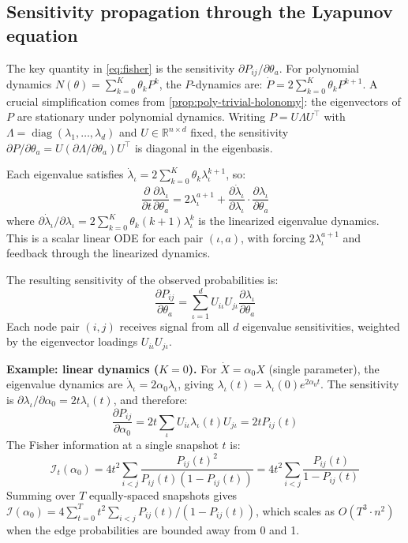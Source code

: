 \documentclass{article}
\newcommand{\RR}{\mathbb{R}}
\DeclareMathOperator{\diag}{diag}
\theoremstyle{plain}
\theoremstyle{definition}
\theoremstyle{remark}
\begin{document}
\subsection{Sensitivity propagation through the Lyapunov equation}

The key quantity in \cref{eq:fisher} is the sensitivity $\partial P_{ij} / \partial \theta_a$.
For polynomial dynamics $N(\theta) = \sum_{k=0}^K \theta_k P^k$, the $P$-dynamics are:
$\dot{P} = 2 \sum_{k=0}^K \theta_k P^{k+1}$.
A crucial simplification comes from \cref{prop:poly-trivial-holonomy}: the eigenvectors of $P$ are stationary under polynomial dynamics.
Writing $P = U \Lambda U^\top$ with $\Lambda = \diag(\lambda_1, \ldots, \lambda_d)$ and $U \in \RR^{n \times d}$ fixed, the sensitivity $\partial P / \partial \theta_a = U (\partial \Lambda / \partial \theta_a) U^\top$ is diagonal in the eigenbasis.

Each eigenvalue satisfies $\dot{\lambda}_\iota = 2 \sum_{k=0}^K \theta_k \lambda_\iota^{k+1}$, so:
\begin{equation}
\frac{\partial}{\partial t} \frac{\partial \lambda_\iota}{\partial \theta_a} = 2 \lambda_\iota^{a+1} + \frac{\partial \dot{\lambda}_\iota}{\partial \lambda_\iota} \cdot \frac{\partial \lambda_\iota}{\partial \theta_a}
\end{equation}
where $\partial \dot{\lambda}_\iota / \partial \lambda_\iota = 2 \sum_{k=0}^K \theta_k (k+1) \lambda_\iota^k$ is the linearized eigenvalue dynamics.
This is a scalar linear ODE for each pair $(\iota, a)$, with forcing $2 \lambda_\iota^{a+1}$ and feedback through the linearized dynamics.

The resulting sensitivity of the observed probabilities is:
\begin{equation}\label{eq:poly-sensitivity}
\frac{\partial P_{ij}}{\partial \theta_a} = \sum_{\iota=1}^d U_{i\iota} U_{j\iota} \frac{\partial \lambda_\iota}{\partial \theta_a}
\end{equation}
Each node pair $(i,j)$ receives signal from all $d$ eigenvalue sensitivities, weighted by the eigenvector loadings $U_{i\iota} U_{j\iota}$.

\textbf{Example: linear dynamics ($K = 0$).}
For $\dot{X} = \alpha_0 X$ (single parameter), the eigenvalue dynamics are $\dot{\lambda}_\iota = 2 \alpha_0 \lambda_\iota$, giving $\lambda_\iota(t) = \lambda_\iota(0) e^{2 \alpha_0 t}$.
The sensitivity is $\partial \lambda_\iota / \partial \alpha_0 = 2 t \lambda_\iota(t)$, and therefore:
\begin{equation}
\frac{\partial P_{ij}}{\partial \alpha_0} = 2 t \sum_\iota U_{i\iota} \lambda_\iota(t) U_{j\iota} = 2 t P_{ij}(t)
\end{equation}
The Fisher information at a single snapshot $t$ is:
\begin{equation}
\mathcal{I}_t(\alpha_0) = 4 t^2 \sum_{i < j} \frac{P_{ij}(t)^2}{P_{ij}(t)(1 - P_{ij}(t))} = 4 t^2 \sum_{i < j} \frac{P_{ij}(t)}{1 - P_{ij}(t)}
\end{equation}
Summing over $T$ equally-spaced snapshots gives $\mathcal{I}(\alpha_0) = 4 \sum_{t=0}^T t^2 \sum_{i<j} P_{ij}(t) / (1 - P_{ij}(t))$, which scales as $O(T^3 \cdot n^2)$ when the edge probabilities are bounded away from 0 and 1.
\end{document}
